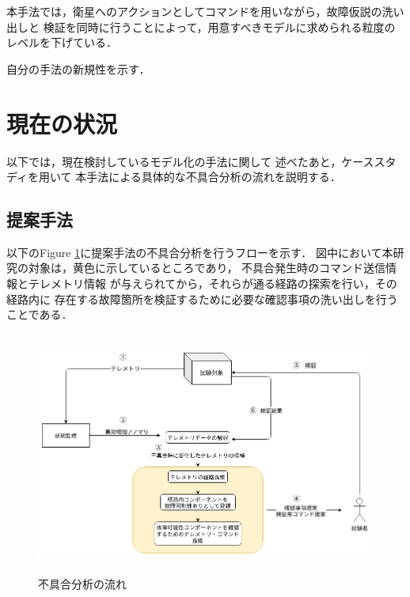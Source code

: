 \documentclass[11pt]{article}
\begin{document}
本手法では，衛星へのアクションとしてコマンドを用いながら，故障仮説の洗い出しと
検証を同時に行うことによって，用意すべきモデルに求められる粒度のレベルを下げている．

自分の手法の新規性を示す．


\section{現在の状況}
以下では，現在検討しているモデル化の手法に関して
述べたあと，ケーススタディを用いて
本手法による具体的な不具合分析の流れを説明する．

\subsection{提案手法}
以下のFigure \ref{fig:fault_diagnosis}に提案手法の不具合分析を行うフローを示す．
図中において本研究の対象は，黄色に示しているところであり，
不具合発生時のコマンド送信情報とテレメトリ情報
が与えられてから，それらが通る経路の探索を行い，その経路内に
存在する故障箇所を検証するために必要な確認事項の洗い出しを行うことである．

\begin{figure}[H]
   \centering
      \includegraphics[height=8.0cm]{figure/fault_diagnosis_flow.png}
      \caption{不具合分析の流れ}
      \label{fig:fault_diagnosis}
\end{figure}
\end{document}

